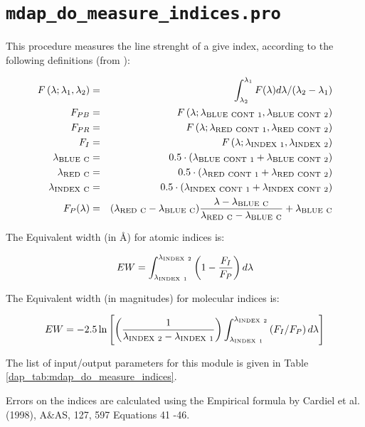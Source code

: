 \section{{\tt mdap\_do\_measure\_indices.pro}}
\label{dap_sec:mdap_do_measure_indices}

This procedure measures the line strenght of a give index, according to the following definitions (from \citealt{Worthey+94}): 


\begin{eqnarray}
F\left(\lambda; \lambda_1, \lambda_2 \right) &=& \int_{\lambda_2}^{\lambda_1} F(\lambda)d\lambda/(\lambda_2 - \lambda_1) \nonumber \\
F_{PB} &=& F\left(\lambda; \lambda_{\rm BLUE\ CONT\ 1}, \lambda_{\rm BLUE\ CONT\ 2} \right) \nonumber \\
F_{PR} &=& F\left(\lambda; \lambda_{\rm RED\ CONT\ 1}, \lambda_{\rm RED\ CONT\ 2} \right) \nonumber  \\
F_{I} &=& F\left(\lambda; \lambda_{\rm INDEX\ 1}, \lambda_{\rm INDEX\ 2} \right) \nonumber  \nonumber  \\
\lambda_{\rm BLUE\ C} &=& 0.5 \cdot (\lambda_{\rm BLUE\ CONT\ 1} + \lambda_{\rm BLUE\ CONT\ 2}) \nonumber  \\
\lambda_{\rm RED\ C} &=& 0.5 \cdot (\lambda_{\rm RED\ CONT\ 1} + \lambda_{\rm RED\ CONT\ 2}) \nonumber  \\
\lambda_{\rm INDEX\ C} &=& 0.5 \cdot (\lambda_{\rm INDEX\ CONT\ 1} + \lambda_{\rm INDEX\ CONT\ 2}) \nonumber  \\
F_P(\lambda) &=& (\lambda_{\rm RED\ C} -\lambda_{\rm BLUE\ C} )\frac{\lambda-\lambda_{\rm BLUE\ C}}{\lambda_{\rm RED\ C} -\lambda_{\rm BLUE\ C}}+\lambda_{\rm BLUE\ C}
\end{eqnarray}

The Equivalent width (in \AA) for atomic indices is:

\[
EW =  \int_{\lambda_{\rm INDEX\ 1}}^{\lambda_{\rm INDEX\ 2}} \left( 1 - \frac{F_I}{F_P} \right) d\lambda
\]

The Equivalent width (in magnitudes) for molecular indices is:

\[
EW =  -2.5 \ln \left[ \left( \frac{1}{\lambda_{\rm INDEX\ 2} - \lambda_{\rm INDEX\ 1}} \right)  \int_{\lambda_{\rm INDEX\ 1}}^{\lambda_{\rm INDEX\ 2}} \left( F_I/F_P\right) d\lambda \right]
\]

The list of input/output parameters for this module is given in Table
\ref{dap_tab:mdap_do_measure_indices}.

Errors on the indices are calculated using the Empirical formula by
Cardiel et al. (1998), A\&AS, 127, 597 Equations 41 -46.

